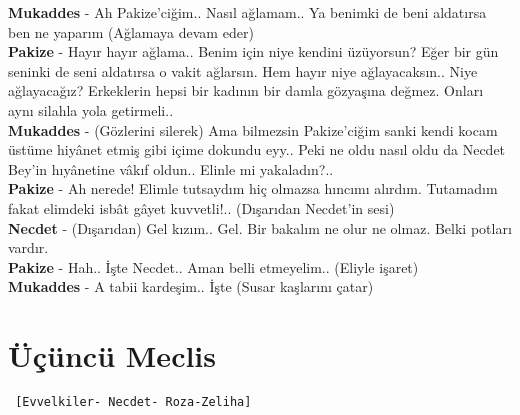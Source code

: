 \documentclass[]{book}
\begin{document}
\textbf{Mukaddes} - Ah Pakize'ciğim.. Nasıl ağlamam.. Ya benimki de beni aldatırsa ben ne yaparım (Ağlamaya devam eder)\\
\textbf{Pakize} - Hayır hayır ağlama.. Benim için niye kendini üzüyorsun? Eğer bir gün seninki de seni aldatırsa o vakit ağlarsın. Hem hayır niye ağlayacaksın.. Niye ağlayacağız? Erkeklerin hepsi bir kadının bir damla gözyaşına değmez. Onları aynı silahla yola getirmeli..\\
\textbf{Mukaddes} - (Gözlerini silerek) Ama bilmezsin Pakize'ciğim sanki kendi kocam üstüme hiyânet etmiş gibi içime dokundu eyy.. Peki ne oldu nasıl oldu da Necdet Bey'in hıyânetine vâkıf oldun.. Elinle mi yakaladın?..\\
\textbf{Pakize} - Ah nerede! Elimle tutsaydım hiç olmazsa hıncımı alırdım. Tutamadım fakat elimdeki isbât gâyet kuvvetli!..
(Dışarıdan Necdet'in sesi)\\
\textbf{Necdet} - (Dışarıdan) Gel kızım.. Gel. Bir bakalım ne olur ne olmaz. Belki potları vardır.\\
\textbf{Pakize} - Hah.. İşte Necdet.. Aman belli etmeyelim.. (Eliyle işaret)\\
\textbf{Mukaddes} - A tabii kardeşim.. İşte (Susar kaşlarını çatar)\\

\hypertarget{ucuncu-meclis}{%
\section{Üçüncü Meclis}\label{ucuncu-meclis}}

\begin{verbatim}
 [Evvelkiler- Necdet- Roza-Zeliha]
\end{verbatim}
\end{document}

